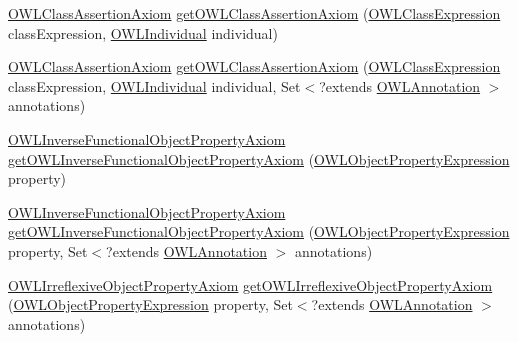 \begin{DoxyCompactItemize}
\item 
\hyperlink{interfaceorg_1_1semanticweb_1_1owlapi_1_1model_1_1_o_w_l_class_assertion_axiom}{O\-W\-L\-Class\-Assertion\-Axiom} \hyperlink{classuk_1_1ac_1_1manchester_1_1cs_1_1owl_1_1owlapi_1_1_o_w_l_data_factory_impl_a61560cda5ef10dcc73e323ab127289d2}{get\-O\-W\-L\-Class\-Assertion\-Axiom} (\hyperlink{interfaceorg_1_1semanticweb_1_1owlapi_1_1model_1_1_o_w_l_class_expression}{O\-W\-L\-Class\-Expression} class\-Expression, \hyperlink{interfaceorg_1_1semanticweb_1_1owlapi_1_1model_1_1_o_w_l_individual}{O\-W\-L\-Individual} individual)
\item 
\hyperlink{interfaceorg_1_1semanticweb_1_1owlapi_1_1model_1_1_o_w_l_class_assertion_axiom}{O\-W\-L\-Class\-Assertion\-Axiom} \hyperlink{classuk_1_1ac_1_1manchester_1_1cs_1_1owl_1_1owlapi_1_1_o_w_l_data_factory_impl_a456a403650df43e0487f7c0c0a6f2781}{get\-O\-W\-L\-Class\-Assertion\-Axiom} (\hyperlink{interfaceorg_1_1semanticweb_1_1owlapi_1_1model_1_1_o_w_l_class_expression}{O\-W\-L\-Class\-Expression} class\-Expression, \hyperlink{interfaceorg_1_1semanticweb_1_1owlapi_1_1model_1_1_o_w_l_individual}{O\-W\-L\-Individual} individual, Set$<$?extends \hyperlink{interfaceorg_1_1semanticweb_1_1owlapi_1_1model_1_1_o_w_l_annotation}{O\-W\-L\-Annotation} $>$ annotations)
\item 
\hyperlink{interfaceorg_1_1semanticweb_1_1owlapi_1_1model_1_1_o_w_l_inverse_functional_object_property_axiom}{O\-W\-L\-Inverse\-Functional\-Object\-Property\-Axiom} \hyperlink{classuk_1_1ac_1_1manchester_1_1cs_1_1owl_1_1owlapi_1_1_o_w_l_data_factory_impl_a681c612877cad99e04bf3fa157af1c5f}{get\-O\-W\-L\-Inverse\-Functional\-Object\-Property\-Axiom} (\hyperlink{interfaceorg_1_1semanticweb_1_1owlapi_1_1model_1_1_o_w_l_object_property_expression}{O\-W\-L\-Object\-Property\-Expression} property)
\item 
\hyperlink{interfaceorg_1_1semanticweb_1_1owlapi_1_1model_1_1_o_w_l_inverse_functional_object_property_axiom}{O\-W\-L\-Inverse\-Functional\-Object\-Property\-Axiom} \hyperlink{classuk_1_1ac_1_1manchester_1_1cs_1_1owl_1_1owlapi_1_1_o_w_l_data_factory_impl_af200d04cd599353e88c8ca68ebb24b3b}{get\-O\-W\-L\-Inverse\-Functional\-Object\-Property\-Axiom} (\hyperlink{interfaceorg_1_1semanticweb_1_1owlapi_1_1model_1_1_o_w_l_object_property_expression}{O\-W\-L\-Object\-Property\-Expression} property, Set$<$?extends \hyperlink{interfaceorg_1_1semanticweb_1_1owlapi_1_1model_1_1_o_w_l_annotation}{O\-W\-L\-Annotation} $>$ annotations)
\item 
\hyperlink{interfaceorg_1_1semanticweb_1_1owlapi_1_1model_1_1_o_w_l_irreflexive_object_property_axiom}{O\-W\-L\-Irreflexive\-Object\-Property\-Axiom} \hyperlink{classuk_1_1ac_1_1manchester_1_1cs_1_1owl_1_1owlapi_1_1_o_w_l_data_factory_impl_ab1bfe2beedf66e2e819a3bc5140f5921}{get\-O\-W\-L\-Irreflexive\-Object\-Property\-Axiom} (\hyperlink{interfaceorg_1_1semanticweb_1_1owlapi_1_1model_1_1_o_w_l_object_property_expression}{O\-W\-L\-Object\-Property\-Expression} property, Set$<$?extends \hyperlink{interfaceorg_1_1semanticweb_1_1owlapi_1_1model_1_1_o_w_l_annotation}{O\-W\-L\-Annotation} $>$ annotations)

\end{DoxyCompactItemize}

